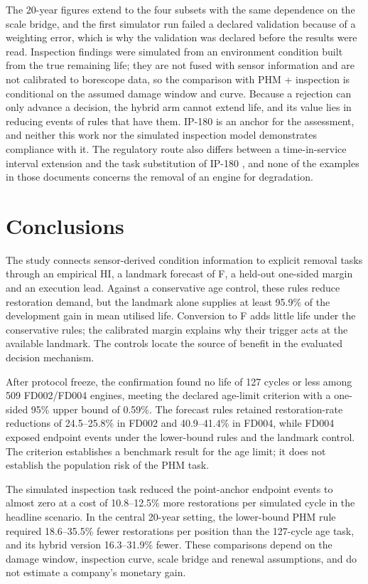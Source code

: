 \documentclass[preprint,12pt]{elsarticle}
\begin{document}
The 20-year figures extend to the four subsets with the same dependence on the scale bridge, and the first simulator run failed a declared validation because of a weighting error, which is why the validation was declared before the results were read. Inspection findings were simulated from an environment condition built from the true remaining life; they are not fused with sensor information and are not calibrated to borescope data, so the comparison with PHM + inspection is conditional on the assumed damage window and curve. Because a rejection can only advance a decision, the hybrid arm cannot extend life, and its value lies in reducing events of rules that have them. IP-180 is an anchor for the assessment, and neither this work nor the simulated inspection model demonstrates compliance with it. The regulatory route also differs between a time-in-service interval extension \cite{AC120113} and the task substitution of IP-180 \cite{IP180,IP197}, and none of the examples in those documents concerns the removal of an engine for degradation.

\section{Conclusions}\label{sec:pilot-conclusion}

The study connects sensor-derived condition information to explicit removal tasks through an empirical HI, a landmark forecast of F, a held-out one-sided margin and an execution lead. Against a conservative age control, these rules reduce restoration demand, but the landmark alone supplies at least 95.9\% of the development gain in mean utilised life. Conversion to F adds little life under the conservative rules; the calibrated margin explains why their trigger acts at the available landmark. The controls locate the source of benefit in the evaluated decision mechanism.

After protocol freeze, the confirmation found no life of 127 cycles or less among 509 FD002/FD004 engines, meeting the declared age-limit criterion with a one-sided 95\% upper bound of 0.59\%. The forecast rules retained restoration-rate reductions of 24.5--25.8\% in FD002 and 40.9--41.4\% in FD004, while FD004 exposed endpoint events under the lower-bound rules and the landmark control. The criterion establishes a benchmark result for the age limit; it does not establish the population risk of the PHM task.

The simulated inspection task reduced the point-anchor endpoint events to almost zero at a cost of 10.8--12.5\% more restorations per simulated cycle in the headline scenario. In the central 20-year setting, the lower-bound PHM rule required 18.6--35.5\% fewer restorations per position than the 127-cycle age task, and its hybrid version 16.3--31.9\% fewer. These comparisons depend on the damage window, inspection curve, scale bridge and renewal assumptions, and do not estimate a company's monetary gain.
\end{document}
